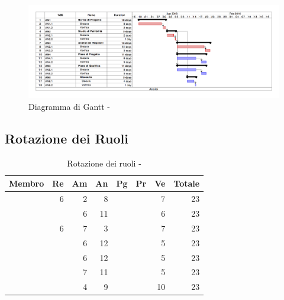 \documentclass[12pt,a4paper]{article}
\begin{document}
\begin{center}
	\begin{figure}[H]
		\centering
		\includegraphics[width=\textwidth]{GanttAnalisi.png}
		\caption{Diagramma di Gantt - \FA}
	\end{figure}
\end{center}


\newpage

\subsection{Rotazione dei Ruoli}

\begin{table}[H]
	\begin{center}
		\begin{tabular}{l r r r r r r r}
			\toprule
			\textbf{Membro}	&	\textbf{Re}	&	\textbf{Am}	& \textbf{An} & \textbf{Pg} & \textbf{Pr} & \textbf{Ve} & \textbf{Totale}\\
			\midrule
			\midrule
			\IB & 6 & 2 & 8 & & & 7 & 23 \\
			\midrule
			\AB & & 6 & 11 & & & 6 & 23 \\
			\midrule
			\NDC & 6 & 7 & 3 & & & 7 & 23 \\
			\midrule
			\TP & & 6 & 12 & & & 5 & 23 \\
			\midrule
			\WS & & 6 & 12 & & & 5 & 23 \\
			\midrule
			\AVE & & 7 & 11 & & & 5 & 23 \\
			\midrule
			\AVI & & 4 & 9 & & & 10 & 23 \\
			\bottomrule
		\end{tabular}
		\caption{Rotazione dei ruoli - \FA}
	\end{center}
\end{table}
\end{document}
